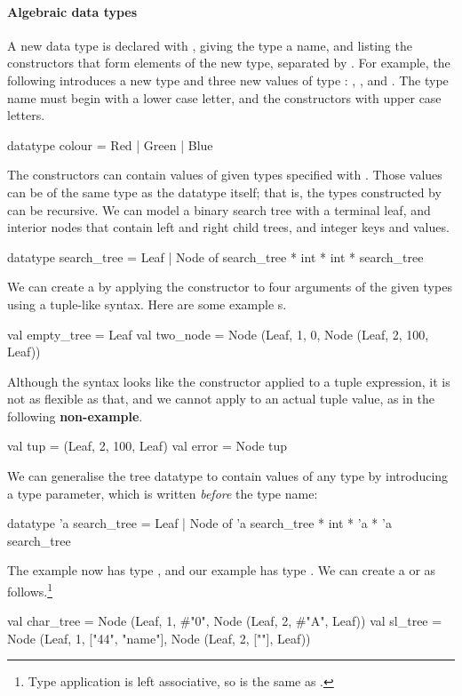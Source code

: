 \documentclass[12pt,a4paper]{book}
\begin{document}
\paragraph{Algebraic data types}

A new data type is declared with , giving the
type a name, and listing the constructors that form elements of the new type,
separated by \smlinline{|}. For example, the following introduces a new type  and three new values of type : , , and .
The type name must begin with a lower case letter, and the constructors with upper case letters.
\begin{smlcode}
datatype colour = Red | Green | Blue
\end{smlcode}

The constructors can contain values of given types specified with
. Those values can be of the same type as the datatype
itself; that is, the types constructed by  can be recursive.
We can model a binary search tree with a terminal leaf, and interior nodes that
contain left and right child trees, and integer keys and values.
\begin{smlcode}
datatype search_tree =
  Leaf
| Node of search_tree * int * int * search_tree
\end{smlcode}
We can create a  by applying the constructor to four
arguments of the given types using a tuple-like syntax. Here are some example
s.
\begin{smlcode}
val empty_tree = Leaf
val two_node = Node (Leaf, 1, 0, Node (Leaf, 2, 100, Leaf))
\end{smlcode}
Although the syntax looks like the constructor applied to a tuple expression,
it is not as flexible as that, and we cannot apply  to an
actual tuple value, as in the following \textbf{non-example}.
\begin{smlcode}
val tup = (Leaf, 2, 100, Leaf)
val error = Node tup
\end{smlcode}

We can generalise the tree datatype to contain values of any type by
introducing a type parameter, which is written \emph{before} the type name:
\begin{smlcode}
datatype 'a search_tree =
  Leaf
| Node of 'a search_tree * int * 'a * 'a search_tree
\end{smlcode}
The  example now has type , and our
 example has type . We can create a
 or  as follows.\footnote{Type application is left associative, so  is the same as .}
\begin{smlcode}
val char_tree =
  Node (Leaf, 1, #"0", Node (Leaf, 2, #"A", Leaf))
val sl_tree =
  Node (Leaf, 1, ["44", "name"], Node (Leaf, 2, [""], Leaf))
\end{smlcode}
\end{document}
